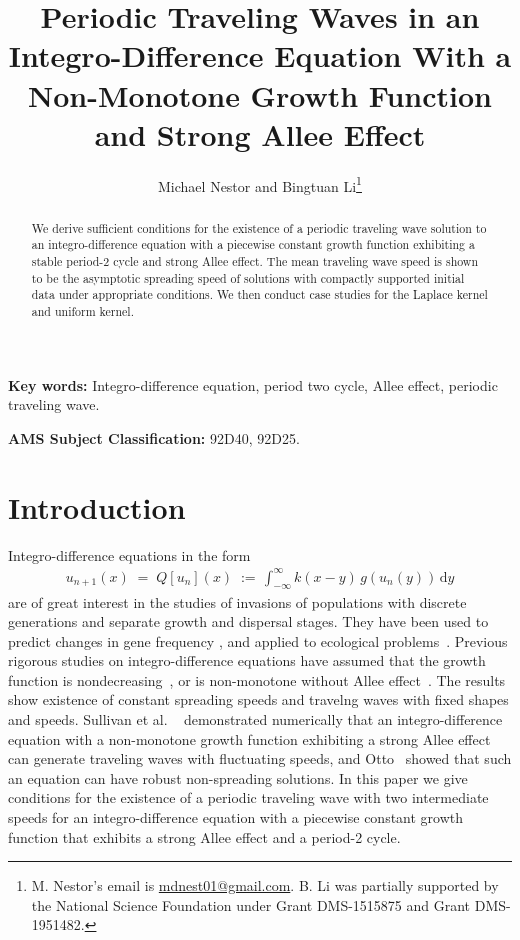 \documentclass[11pt]{article}
\title{Periodic Traveling Waves in an Integro-Difference Equation With a Non-Monotone Growth Function and Strong Allee Effect}
\date{}
\author{Michael Nestor and Bingtuan Li\thanks{M. Nestor's email is \href{mailto:mdnest01@gmail.com}{mdnest01@gmail.com}. B. Li was partially supported by the National Science Foundation under Grant DMS-1515875 and Grant DMS-1951482.}}
\affil{Department of Mathematics, University of Louisville\linebreak Louisville, KY 40292}
\theoremstyle{definition}
\numberwithin{equation}{section}
\numberwithin{thm}{section}
\renewcommand{\d}{\,\mathrm{d}}
\begin{document}
\maketitle

\begin{abstract}
We derive sufficient conditions for the existence of a periodic traveling wave solution to an integro-difference equation with a piecewise constant growth function exhibiting a stable period-2 cycle and strong Allee effect.
The mean traveling wave speed is shown to be the asymptotic spreading speed of solutions with compactly supported initial data under appropriate conditions.
We then conduct case studies for the Laplace kernel and uniform kernel.
\end{abstract}

{\bf Key words:} Integro-difference equation, period two cycle, Allee effect, periodic traveling wave.
\newline

{\bf AMS Subject Classification:} 92D40, 92D25.

\section{Introduction}

Integro-difference equations in the form 
\begin{align}\label{q}
u_{n+1}(x)\;=\;Q[u_n](x)\;:=\,\int^{\infty}_{-\infty}k(x-y)\,g\left(u_n(y)\right) \d y
\end{align}
are of great interest in the studies of invasions of populations with discrete generations and separate growth and dispersal stages.
They have been used to predict changes in gene frequency \cite{lui82a, lui82b, lui83, slatkin, w78}, and applied to ecological problems~\cite{hh, ks, kot89, kot92, kotbook, lut, nkl,otto}.
Previous rigorous studies on integro-difference equations have assumed that the growth function is nondecreasing~\cite{w78, wein82}, or is non-monotone without Allee effect~\cite{lui83, wang}.
The results show existence of constant spreading speeds and travelng waves with fixed shapes and speeds.
Sullivan et al. ~\cite{pnas} demonstrated numerically that an integro-difference equation with a non-monotone growth function exhibiting a strong Allee effect can generate traveling waves with fluctuating speeds, and Otto~\cite{otto} showed that such an equation can have robust non-spreading solutions.
In this paper we give conditions for the existence of a periodic traveling wave with two intermediate speeds for an integro-difference equation with a piecewise constant growth function that exhibits a strong Allee effect and a period-2 cycle. 
\end{document}
